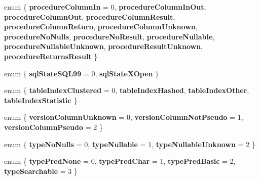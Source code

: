 \begin{DoxyCompactItemize}
\hypertarget{classsql_1_1_database_meta_data_a01e82d85f8940a6f7de5f1330ed17516}{}\label{classsql_1_1_database_meta_data_a01e82d85f8940a6f7de5f1330ed17516} 
enum \{ \newline
{\bfseries procedure\+Column\+In} = 0, 
{\bfseries procedure\+Column\+In\+Out}, 
{\bfseries procedure\+Column\+Out}, 
{\bfseries procedure\+Column\+Result}, 
\newline
{\bfseries procedure\+Column\+Return}, 
{\bfseries procedure\+Column\+Unknown}, 
{\bfseries procedure\+No\+Nulls}, 
{\bfseries procedure\+No\+Result}, 
\newline
{\bfseries procedure\+Nullable}, 
{\bfseries procedure\+Nullable\+Unknown}, 
{\bfseries procedure\+Result\+Unknown}, 
{\bfseries procedure\+Returns\+Result}
 \}
\item 
\hypertarget{classsql_1_1_database_meta_data_aad24aedab12fce271e473fdd723bbe86}{}\label{classsql_1_1_database_meta_data_aad24aedab12fce271e473fdd723bbe86} 
enum \{ {\bfseries sql\+State\+S\+Q\+L99} = 0, 
{\bfseries sql\+State\+X\+Open}
 \}
\item 
\hypertarget{classsql_1_1_database_meta_data_a61b9d896dcca26b2297a581e4f952efc}{}\label{classsql_1_1_database_meta_data_a61b9d896dcca26b2297a581e4f952efc} 
enum \{ {\bfseries table\+Index\+Clustered} = 0, 
{\bfseries table\+Index\+Hashed}, 
{\bfseries table\+Index\+Other}, 
{\bfseries table\+Index\+Statistic}
 \}
\item 
\hypertarget{classsql_1_1_database_meta_data_ac1be8c81bf9636c23197cf44ebc03012}{}\label{classsql_1_1_database_meta_data_ac1be8c81bf9636c23197cf44ebc03012} 
enum \{ {\bfseries version\+Column\+Unknown} = 0, 
{\bfseries version\+Column\+Not\+Pseudo} = 1, 
{\bfseries version\+Column\+Pseudo} = 2
 \}
\item 
\hypertarget{classsql_1_1_database_meta_data_a84ba71d4c78795c60e9ae7e391b09b88}{}\label{classsql_1_1_database_meta_data_a84ba71d4c78795c60e9ae7e391b09b88} 
enum \{ {\bfseries type\+No\+Nulls} = 0, 
{\bfseries type\+Nullable} = 1, 
{\bfseries type\+Nullable\+Unknown} = 2
 \}
\item 
\hypertarget{classsql_1_1_database_meta_data_a8201bbaaed4571db1fef210376f87b11}{}\label{classsql_1_1_database_meta_data_a8201bbaaed4571db1fef210376f87b11} 
enum \{ {\bfseries type\+Pred\+None} = 0, 
{\bfseries type\+Pred\+Char} = 1, 
{\bfseries type\+Pred\+Basic} = 2, 
{\bfseries type\+Searchable} = 3
 \}
\end{DoxyCompactItemize}
